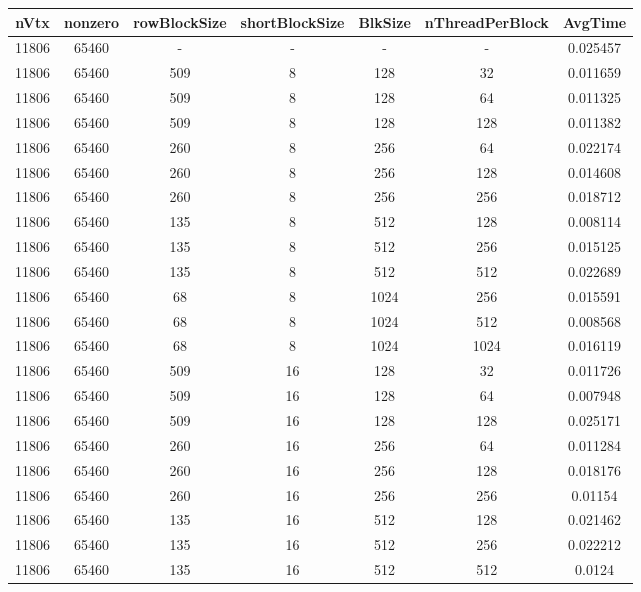 \documentclass[9pt]{article}
\begin{document}
\SetBgPosition{0.25cm,-5.0cm}
\begin{tabular}{|c|c|c|c|c|c|c| }  
\hline
nVtx  & nonzero  & rowBlockSize  & shortBlockSize  & BlkSize  & nThreadPerBlock  & AvgTime \\
\hline
11806  & 65460  &  -  & -  & -  & -  &0.025457 \\
\hline
11806  & 65460  & 509  & 8  & 128  & 32  & 0.011659 \\
\hline
11806  & 65460  & 509  & 8  & 128  & 64  & 0.011325 \\
\hline
11806  & 65460  & 509  & 8  & 128  & 128  & 0.011382 \\
\hline
11806  & 65460  & 260  & 8  & 256  & 64  & 0.022174 \\
\hline
11806  & 65460  & 260  & 8  & 256  & 128  & 0.014608 \\
\hline
11806  & 65460  & 260  & 8  & 256  & 256  & 0.018712 \\
\hline
11806  & 65460  & 135  & 8  & 512  & 128  & 0.008114 \\
\hline
11806  & 65460  & 135  & 8  & 512  & 256  & 0.015125 \\
\hline
11806  & 65460  & 135  & 8  & 512  & 512  & 0.022689 \\
\hline
11806  & 65460  & 68  & 8  & 1024  & 256  & 0.015591 \\
\hline
11806  & 65460  & 68  & 8  & 1024  & 512  & 0.008568 \\
\hline
11806  & 65460  & 68  & 8  & 1024  & 1024  & 0.016119 \\
\hline
11806  & 65460  & 509  & 16  & 128  & 32  & 0.011726 \\
\hline
11806  & 65460  & 509  & 16  & 128  & 64  & 0.007948 \\
\hline
11806  & 65460  & 509  & 16  & 128  & 128  & 0.025171 \\
\hline
11806  & 65460  & 260  & 16  & 256  & 64  & 0.011284 \\
\hline
11806  & 65460  & 260  & 16  & 256  & 128  & 0.018176 \\
\hline
11806  & 65460  & 260  & 16  & 256  & 256  & 0.01154 \\
\hline
11806  & 65460  & 135  & 16  & 512  & 128  & 0.021462 \\
\hline
11806  & 65460  & 135  & 16  & 512  & 256  & 0.022212 \\
\hline
11806  & 65460  & 135  & 16  & 512  & 512  & 0.0124 \\

\end{tabular}
\end{document}
